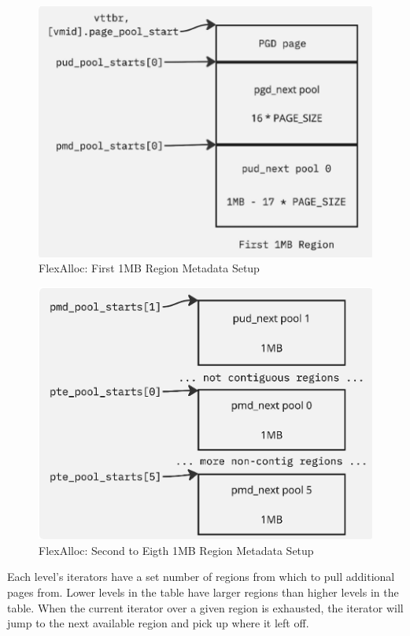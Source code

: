 \begin{figure}[h!tbp]
\caption{FlexAlloc: First 1MB Region Metadata Setup}
\label{fig:firstmbregion}
\centering
    \includegraphics{firstmbregion}
\end{figure}

\begin{figure}[h!tbp]
\caption{FlexAlloc: Second to Eigth 1MB Region Metadata Setup}
\label{fig:otherregions}
\centering
    \includegraphics{otherregions}
\end{figure}

Each level's iterators have a set number of regions from which to pull additional pages from. Lower
levels in the table have larger regions than higher levels in the table. When the current iterator
over a given region is exhausted, the iterator will jump to the next available region and pick up
where it left off.


